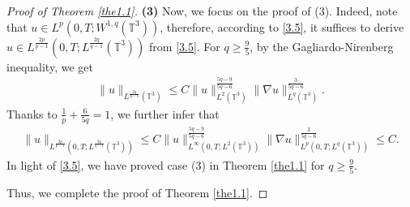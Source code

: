\documentclass[11pt]{article}
\theoremstyle{plain}\newtheorem{definition}{Definition}[section]
\theoremstyle{definition}\newtheorem{theorem}{Theorem}[section]
\theoremstyle{plain}\newtheorem{lemma}[theorem]{Lemma}
\theoremstyle{plain}\newtheorem{coro}[theorem]{Corollary}
\theoremstyle{plain}\newtheorem{prop}[theorem]{Proposition}
\theoremstyle{remark}\newtheorem{remark}{Remark}[section]
\newcommand{\f}{\frac}
\numberwithin{equation}{section}
\begin{document}
\begin{proof}[Proof of Theorem \ref{the1.1}]
{\bf (3)} Now, we focus on the proof of (3). Indeed, note that $  u\in L^{p}(0,T;W^{1,q}(\mathbb{T}^{3}))$, therefore, according to \eqref{3.5},
it suffices to derive  $u\in L^{\f{2p}{p-1}}(0,T;L^{\f{2q}{q-1}}(\mathbb{T}^3)) $   from  \eqref{3.5}.  For $q\geq \frac{9}{5}$, by the Gagliardo-Nirenberg   inequality, we get
 \begin{equation}\label{c19}
 \begin{aligned}
  \|u\|_{L^{\f{2q}{q-1}}(\mathbb{T}^3)}\leq C\|u\|_{L^{2}(\mathbb{T}^3)}^{\f{5q-9}{5q-6}}\|\nabla u\|_{L^{q}(\mathbb{T}^3)}^{\f{3}{5q-6}}.
  \end{aligned}\end{equation}
  Thanks to $\frac{1}{p}+\frac{6}{5 q}=1$, we further infer that
\begin{equation}\label{c20}
\begin{aligned}
  \|u\|_{L^{\f{2p}{p-1}}(0,T;L^{\f{2q}{q-1}}(\mathbb{T}^3))}\leq C \|u\|_{L^{\infty}(0,T;L^{2}(\mathbb{T}^3))}^{\f{5q-9}{5q-6}}\|\nabla u\|_{L^{p}(0,T;L^{q}(\mathbb{T}^3))}^{\frac{3}{5q-6}}\leq C.
  \end{aligned}\end{equation}
In light of \eqref{3.5}, we have proved case (3) in Theorem \ref{the1.1} for $q\geq \frac{9}{5}$.

Thus, we complete the proof of Theorem \ref{the1.1}.
\end{proof}
\end{document}
